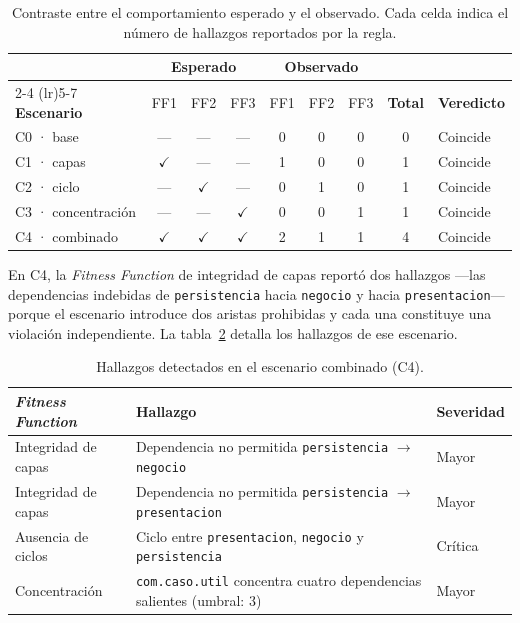 \begin{table}[H]
\centering
\caption{Contraste entre el comportamiento esperado y el observado. Cada celda indica el número de hallazgos reportados por la regla.}
\label{tab:matrizObservada}
\small
\begin{tabular}{lcccccccl}
\toprule
& \multicolumn{3}{c}{\textbf{Esperado}} & \multicolumn{3}{c}{\textbf{Observado}} & & \\
\cmidrule(lr){2-4} \cmidrule(lr){5-7}
\textbf{Escenario} & FF1 & FF2 & FF3 & FF1 & FF2 & FF3 & \textbf{Total} & \textbf{Veredicto} \\
\midrule
C0 · base          & --- & --- & --- & 0 & 0 & 0 & 0 & Coincide \\
C1 · capas         & $\checkmark$ & --- & --- & 1 & 0 & 0 & 1 & Coincide \\
C2 · ciclo         & --- & $\checkmark$ & --- & 0 & 1 & 0 & 1 & Coincide \\
C3 · concentración & --- & --- & $\checkmark$ & 0 & 0 & 1 & 1 & Coincide \\
C4 · combinado     & $\checkmark$ & $\checkmark$ & $\checkmark$ & 2 & 1 & 1 & 4 & Coincide \\
\bottomrule
\end{tabular}
\end{table}

En C4, la \textit{Fitness Function} de integridad de capas reportó dos hallazgos ---las dependencias indebidas de \texttt{persistencia} hacia \texttt{negocio} y hacia \texttt{presentacion}--- porque el escenario introduce dos aristas prohibidas y cada una constituye una violación independiente. La tabla~\ref{tab:violaciones} detalla los hallazgos de ese escenario.

\begin{table}[H]
\centering
\caption{Hallazgos detectados en el escenario combinado (C4).}
\label{tab:violaciones}
\footnotesize
\begin{tabularx}{\textwidth}{p{3.1cm}Xp{1.65cm}}
\toprule
\textbf{\textit{Fitness Function}} & \textbf{Hallazgo} & \textbf{Severidad} \\
\midrule
Integridad de capas & Dependencia no permitida \texttt{persistencia} $\rightarrow$ \texttt{negocio} & Mayor \\
\midrule
Integridad de capas & Dependencia no permitida \texttt{persistencia} $\rightarrow$ \texttt{presentacion} & Mayor \\
\midrule
Ausencia de ciclos & Ciclo entre \texttt{presentacion}, \texttt{negocio} y \texttt{persistencia} & Crítica \\
\midrule
Concentración & \texttt{com.caso.util} concentra cuatro dependencias salientes (umbral: 3) & Mayor \\
\bottomrule
\end{tabularx}
\end{table}

